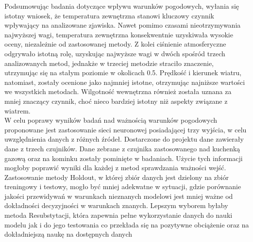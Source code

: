 \documentclass[a4paper,twoside,12pt]{book}
\begin{document}
Podsumowując badania dotyczące wpływu warunków pogodowych, wyłania się istotny wniosek, że temperatura zewnętrzna stanowi kluczowy czynnik wpływający na analizowane zjawiska. Nawet pomimo czasami nieotrzymywania najwyższej wagi, temperatura zewnętrzna konsekwentnie uzyskiwała wysokie oceny, niezależnie od zastosowanej metody. Z kolei ciśnienie atmosferyczne odgrywało istotną rolę, uzyskując najwyższe wagi w dwóch spośród trzech analizowanych metod, jednakże w trzeciej metodzie straciło znaczenie, utrzymując się na stałym poziomie w okolicach 0.5. Prędkość i kierunek wiatru, natomiast, zostały ocenione jako najmniej istotne, otrzymując najniższe wartości we wszystkich metodach. Wilgotność wewnętrzna również została uznana za mniej znaczący czynnik, choć nieco bardziej istotny niż aspekty związane z wiatrem.\\
W celu poprawy wyników badań nad ważnością warunków pogodowych proponowane jest zastosowanie sieci neuronowej posiadającej trzy wyjścia, w celu uwzględnienia danych z różnych źródeł. Dostarczone do projektu dane zawierały dane z trzech czujników. Dane zebrane z czujnika zastosowanego nad kuchenką gazową oraz na kominku zostały pominięte w badaniach. Użycie tych informacji mogłoby poprawić wyniki dla każdej z metod sprawdzania ważności wejść.\\
Zastosowanie metody Holdout, w której zbiór danych jest dzielony na zbiór treningowy i testowy, mogło być mniej adekwatne w sytuacji, gdzie porównanie jakości przewidywań w warunkach nieznanych modelowi jest mniej ważne od dokładności decyzyjności w warunkach znanych. Lepszym wyborem byłaby metoda Resubstytacji, która zapewnia pełne wykorzystanie danych do nauki modelu jak i do jego testowania co przekłada się na pozytywne obciążenie oraz na dokładniejszą naukę na dostępnych danych\\
\end{document}
